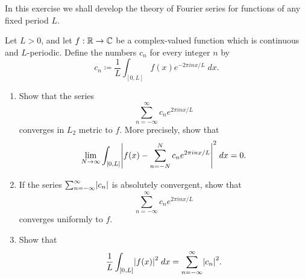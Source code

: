 \begin{ex}\label{ii:ex:5.5.6}
  In this exercise we shall develop the theory of Fourier series for functions of any fixed period \(L\).

  Let \(L > 0\), and let \(f : \mathbb{R} \to \mathbb{C}\) be a complex-valued function which is continuous and \(L\)-periodic.
  Define the numbers \(c_n\) for every integer \(n\) by
  \[
    c_n \coloneqq \dfrac{1}{L} \int_{[0, L]} f(x) e^{- 2 \pi i n x / L} \; dx.
  \]
  \begin{enumerate}
    \item Show that the series
          \[
            \sum_{n = -\infty}^\infty c_n e^{2 \pi i n x / L}
          \]
          converges in \(L_2\) metric to \(f\).
          More precisely, show that
          \[
            \lim_{N \to \infty} \int_{[0, L]} \abs{f(x) - \sum_{n = -N}^N c_n e^{2 \pi i n x / L}}^2 \; dx = 0.
          \]
    \item If the series \(\sum_{n = -\infty}^\infty \abs{c_n}\) is absolutely convergent, show that
          \[
            \sum_{n = -\infty}^\infty c_n e^{2 \pi i n x / L}
          \]
          converges uniformly to \(f\).
    \item Show that
          \[
            \dfrac{1}{L} \int_{[0, L]} \abs{f(x)}^2 \; dx = \sum_{n = -\infty}^\infty \abs{c_n}^2.
          \]
  \end{enumerate}
\end{ex}
